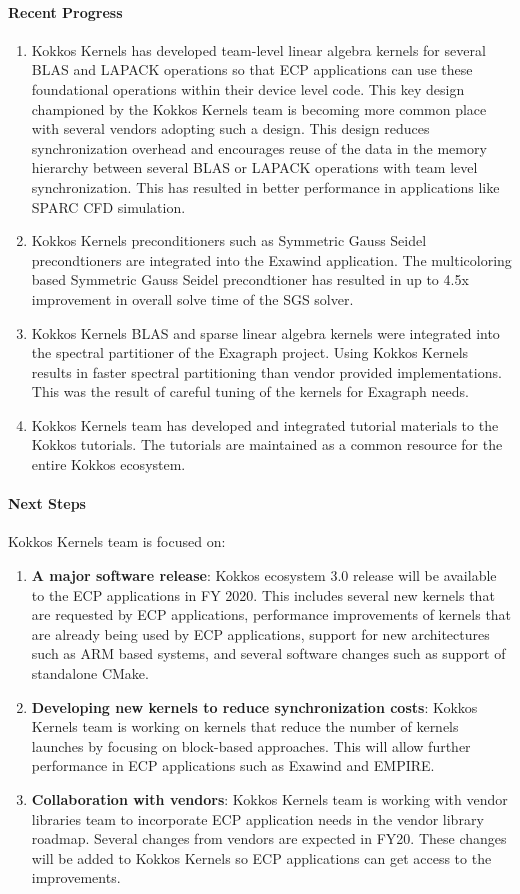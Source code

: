\paragraph{Recent Progress}
\begin{enumerate}
\item Kokkos Kernels has developed team-level linear algebra kernels for several BLAS and LAPACK
operations so that ECP applications can use these foundational operations within their device level code.
This key design championed by the Kokkos Kernels team is becoming more common place with several
vendors adopting such a design. This design reduces synchronization overhead and encourages reuse
of the data in the memory hierarchy between several BLAS or LAPACK operations with team level
synchronization. This has resulted in better performance in applications like SPARC CFD simulation.  
\item Kokkos Kernels preconditioners such as Symmetric Gauss Seidel precondtioners are integrated
into the Exawind application. The multicoloring based Symmetric Gauss Seidel precondtioner has resulted in
up to 4.5x improvement in overall solve time of the SGS solver. 
\item Kokkos Kernels BLAS and sparse linear algebra kernels were integrated into the spectral partitioner
of the Exagraph project. Using Kokkos Kernels results in faster spectral partitioning than vendor provided
implementations. This was the result of careful tuning of the kernels for Exagraph needs.
\item Kokkos Kernels team has developed and integrated tutorial materials to the Kokkos tutorials. The
tutorials are maintained as a common resource for the entire Kokkos ecosystem.
\end{enumerate}

\paragraph{Next Steps}

Kokkos Kernels team is focused on:
\begin{enumerate}
	\item \textbf{A major software release}: Kokkos ecosystem 3.0 release 
	will be available to the ECP applications in FY 2020. This includes several new 
	kernels that are requested by ECP applications, performance improvements of
	kernels that are already being used by ECP applications, support for new architectures
	such as ARM based systems, and several software changes such as support of 
	standalone CMake.  
	\item \textbf{Developing new kernels to reduce synchronization costs}: Kokkos Kernels
	team is working on kernels that reduce the number of kernels launches by focusing on
	block-based approaches. This will allow further performance in ECP applications
	such as Exawind and EMPIRE.
	\item \textbf{Collaboration with vendors}: Kokkos Kernels team is working with vendor
	libraries team to incorporate ECP application needs in the vendor library roadmap.
	Several changes from vendors are expected in FY20. These changes will be added to
	Kokkos Kernels so ECP applications can get access to the improvements. 
\end{enumerate}

